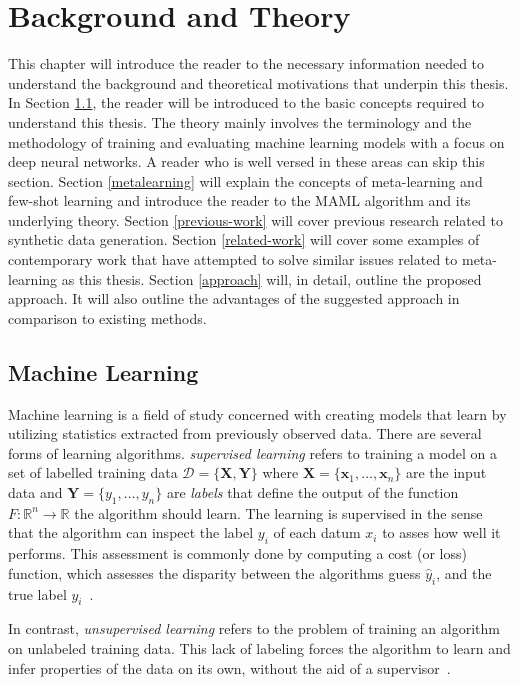 \chapter{Background and Theory}
This chapter will introduce the reader to the necessary information needed to understand the background and theoretical motivations that underpin this thesis. In Section \ref{ML}, the reader will be introduced to the basic concepts required to understand this thesis. The theory mainly involves the terminology and the methodology of training and evaluating machine learning models with a focus on deep neural networks. A reader who is well versed in these areas can skip this section. Section \ref{metalearning} will explain the concepts of meta-learning and few-shot learning and introduce the reader to the \gls{MAML} algorithm and its underlying theory. Section \ref{previous-work} will cover previous research related to synthetic data generation. Section \ref{related-work} will cover some examples of contemporary work that have attempted to solve similar issues related to meta-learning as this thesis. Section \ref{approach} will, in detail, outline the proposed approach. It will also outline the advantages of the suggested approach in comparison to existing methods.

\section{Machine Learning}\label{ML}
Machine learning is a field of study concerned with creating models that learn by utilizing statistics extracted from previously observed data. There are several forms of learning algorithms. \textit{supervised learning} refers to training a model on a set of labelled training data $\mathcal{D} = \{\bm{X}, \bm{Y}\}$ where $\bm{X} = \{\bm{x}_1, \dots, \bm{x}_n\}$ are the input data and $\bm{Y} = \{y_1, \dots, y_n\}$ are \textit{labels} that define the output of the function $F: \mathbb{R}^n \to \mathbb{R}$ the algorithm should learn. The learning is supervised in the sense that the algorithm can inspect the label $y_i$ of each datum $x_i$ to asses how well it performs. This assessment is commonly done by computing a cost (or loss) function, which assesses the disparity between the algorithms guess $\hat{y}_i$, and the true label $y_i$~\cite{deeplearningbook}.

In contrast, \textit{unsupervised learning} refers to the problem of training an algorithm on unlabeled training data. This lack of labeling forces the algorithm to learn and infer properties of the data on its own, without the aid of a supervisor~\cite{deeplearningbook}.


